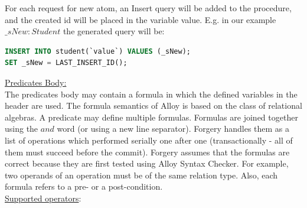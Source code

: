 \documentclass[oneside]{book}
\begin{document}
For each request for new atom, an Insert query will be added to the procedure, and the created id will be placed in the variable value. E.g. in our example $\_sNew : Student$ the generated query will be:
\begin{lstlisting}[escapechar=@,language=SQL]
INSERT INTO student(`value`) VALUES (_sNew);
SET _sNew = LAST_INSERT_ID();
\end{lstlisting}

\noindent\underline{Predicates Body:}\\

\noindent The predicates body may contain a formula in which the defined variables in the header are used. 
The formula semantics of Alloy is based on the class of relational algebras. A predicate may define multiple formulas. Formulas are joined together using the $and$ word (or using a new line separator). Forgery handles them as a list of operations which performed serially one after one (transactionally - all of them must succeed before the commit). Forgery assumes that the formulas are correct because they are first tested using Alloy Syntax Checker. For example, two operands of an operation must be of the same relation type. Also, each formula refers to a pre- or a post-condition.\\

\noindent\underline{Supported operators}:
\end{document}
